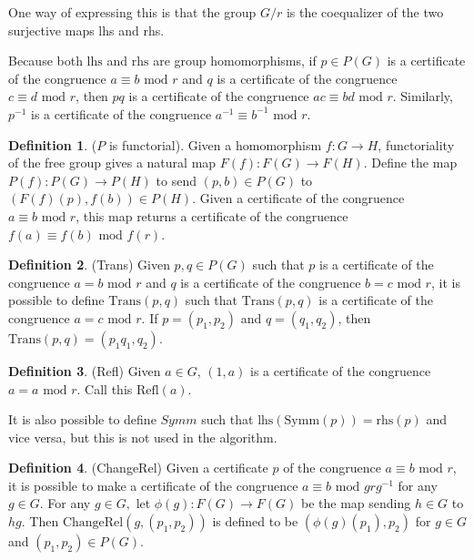 \documentclass[12pt]{article} %
\theoremstyle{definition}
\theoremstyle{definition}
\theoremstyle{definition}
\theoremstyle{definition}
\theoremstyle{definition}
\theoremstyle{definition}
\newtheorem{subdef}{Definition}[theorem]
\begin{document}
One way of expressing this is that the group $G / r$ is the coequalizer of
the two surjective maps lhs and rhs.


Because both $\text{lhs}$ and $\text{rhs}$ are group homomorphisms, if $p \in P(G)$ is a certificate
of the congruence $a \equiv b \text{ mod } r$ and $q$ is a certificate of the congruence
$c \equiv d \text{ mod } r$, then $pq$ is a certificate of the congruence $ac \equiv bd \text{ mod } r$.
Similarly, $p^{-1}$ is a certificate of the congruence $a^{-1} \equiv b^{-1} \text{ mod } r$.

\begin{subdef}($P$ is functorial).
  Given a homomorphism $f: G \to H$,
  functoriality of the free group gives a natural map $F(f): F(G) \to F(H)$.
  Define the map $P(f): P(G) \to P(H)$ to send $(p, b) \in P(G)$ to $(F(f)(p), f(b)) \in P(H)$.
  Given a certificate of the congruence $a \equiv b \text{ mod } r$, this map returns
  a certificate of the congruence $f(a) \equiv f(b) \text{ mod } f(r)$.
\end{subdef}

\begin{subdef}(Trans)
  Given $p,q \in P(G)$ such that $p$ is a certificate of the congruence $a = b \text{ mod } r$
  and $q$ is a certificate of the congruence $b = c \text{ mod } r$, it is possible to define
  $\text{Trans}(p,q)$ such that $\text{Trans}(p,q)$ is a certificate of the congruence $a = c \text{ mod } r$.
  If $p = (p_1, p_2)$ and $q = (q_1, q_2)$, then $\text{Trans}(p,q) = (p_1q_1, q_2)$.
\end{subdef}

\begin{subdef}(Refl)
  Given $a \in G$, $(1, a)$ is a certificate of the congruence $a = a \text{ mod } r$. Call
  this $\text{Refl}(a)$.
\end{subdef}

It is also possible to define $\textit{Symm}$ such that $\text{lhs}(\text{Symm}(p)) = \text{rhs}(p)$
and vice versa, but this is not used in the algorithm.

\begin{subdef}(ChangeRel)
  Given a certificate $p$ of the congruence $a \equiv b \text{ mod } r$, it is possible
  to make a certificate of the congruence $a \equiv b \text{ mod } g r g^{-1}$ for any $g \in G$.
  For any $g \in G,$ let $\phi(g): F(G) \to F(G)$ be the map sending $h \in G$ to
  $hg$. Then $\text{ChangeRel}(g,(p_1,p_2))$ is defined to be $(\phi(g)(p_1), p_2)$ for
  $g \in G$ and $(p_1, p_2) \in P(G)$.
\end{subdef}
\end{document}
